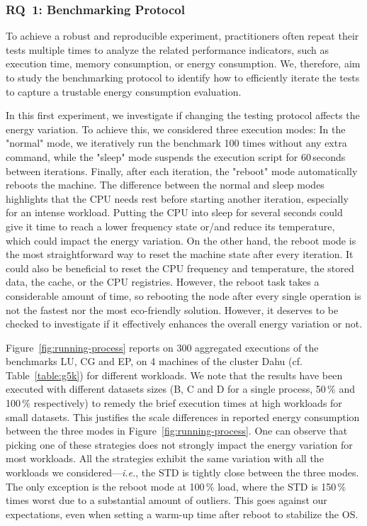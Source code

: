 \subsubsection{\textsc{RQ}~1: Benchmarking Protocol}
To achieve a robust and reproducible experiment, practitioners often repeat their tests multiple times to analyze the related performance indicators, such as execution time, memory consumption, or energy consumption.
We, therefore, aim to study the benchmarking protocol to identify how to efficiently iterate the tests to capture a trustable energy consumption evaluation.

In this first experiment, we investigate if changing the testing protocol affects the energy variation.
To achieve this, we considered three execution modes:
In the \textsf{"normal"} mode, we iteratively run the benchmark 100 times without any extra command, while the \textsf{"sleep"} mode suspends the execution script for 60\,seconds between iterations.
Finally, after each iteration, the \textsf{"reboot"} mode automatically reboots the machine.
The difference between the \textsf{normal} and \textsf{sleep} modes highlights that the CPU needs rest before starting another iteration, especially for an intense workload.
Putting the CPU into sleep for several seconds could give it time to reach a lower frequency state or/and reduce its temperature, which could impact the energy variation.
On the other hand, the \textsf{reboot} mode is the most straightforward way to reset the machine state after every iteration.
It could also be beneficial to reset the CPU frequency and temperature, the stored data, the cache, or the CPU registries.
However, the reboot task takes a considerable amount of time, so rebooting the node after every single operation is not the fastest nor the most eco-friendly solution. However, it deserves to be checked to investigate if it effectively enhances the overall energy variation or not.

Figure~\ref{fig:running-process} reports on $300$ aggregated executions of the  benchmarks \textsf{LU}, \textsf{CG} and \textsf{EP}, on 4 machines of the cluster \textsf{Dahu} (cf. Table~\ref{table:g5k}) for different workloads.
We note that the results have been executed with different datasets sizes (\textsf{B}, \textsf{C} and \textsf{D} for a single process, 50\,\% and 100\,\% respectively) to remedy the brief execution times at high workloads for small datasets.
This justifies the scale differences in reported energy consumption between the three modes in Figure~\ref{fig:running-process}.
One can observe that picking one of these strategies does not strongly impact the energy variation for most workloads.
All the strategies exhibit the same variation with all the workloads we considered---\emph{i.e.}, the STD is tightly close between the three modes.
The only exception is the \textsf{reboot} mode at 100\,\% load, where the STD is 150\,\% times worst due to a substantial amount of outliers.
This goes against our expectations, even when setting a warm-up time after reboot to stabilize the OS.

